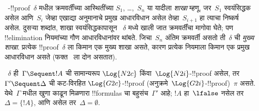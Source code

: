 \documentclass[../../../include/open-logic-section]{subfiles}
\begin{document}
~-!!{proof}~$\delta$ मधील
क्रमवर्तींच्या आस्थितींच्या $S_1$, \dots,~$S_n$
या यादीला \emph{शाखा} म्हणू, जर~$S_1$ स्वयंसिद्धक
असेल आणि~$S_i$ जेव्हा एखाद्या अनुमानाचे प्रमुख
आधारविधान असेल तेव्हा~$S_{i+1}$ हा त्याचा निष्कर्ष
असेल. दुसऱ्या शब्दांत, शाखा स्वयंसिद्धकापासून
~$\delta$ मध्ये खाली जात क्रमवर्तींचा मागोवा घेते;
पण !!{elimination} नियमांच्या गौण आधारविधानांवर थांबते.
जिचा~$S_n$ अंतिम क्रमवर्ती असतो ती~$\delta$ ची
\emph{मुख्य शाखा}. प्रत्येक !!{proof}~$\delta$ ला
किमान एक मुख्य शाखा असते, कारण प्रत्येक नियमाला
किमान एक प्रमुख आधारविधान असते (फक्त~\Intro{\land}
ला दोन असतात).

\begin{prop}
~$\delta$ ही~$\Gamma \Sequent !A$ ची सामान्यरूप
$\Log{N2c}$ किंवा~$\Log{N2i}$-!!{proof} असेल,
तर~$\Gamma' \Sequent \Delta$ ची कट-विरहित
$\Log{G2c}$-!!{proof} (अनुक्रमे~$\Log{G2i}$-!!{proof})~$\pi$
असते. येथे~$\Gamma$ मधील खुणा काढून मिळणारा
!!{formula}s चा बहुसंच~$\Gamma'$ आहे;
$!A$ हा~$\lfalse$ नसेल तर~$\Delta = \{!A\}$,
आणि असेल तर~$\Delta = \emptyset$.
\end{prop}
\end{document}
